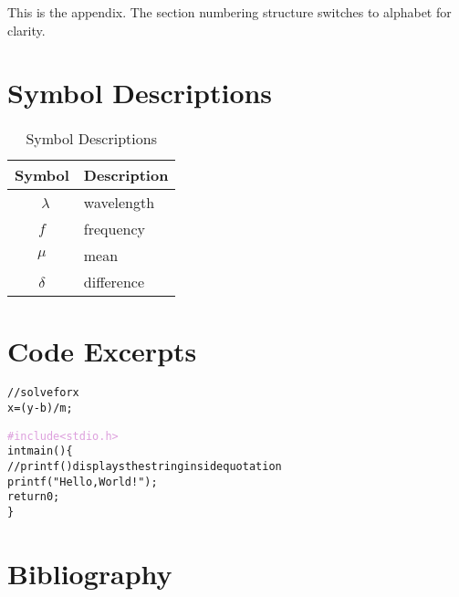 \appendix

This is the appendix.  The section numbering structure switches to alphabet for clarity.

\section{Symbol Descriptions}
\label{sec:symboldescriptions}

	\begin{table}[h]
		\begin{center}
			\caption{Symbol Descriptions}
			\begin{tabular}{|c|l|}
				\hline
				\textbf{Symbol} & \textbf{Description} \\
				\hline
				\hline
				\ $\lambda$ & wavelength \\
				\hline
				$f$ & frequency \\
				\hline
				$\mu$ & mean \\
				\hline
				$\delta$ & difference \\
				\hline
			\end{tabular}
		\end{center}
	\end{table}

\section{Code Excerpts}
	\label{sec:ccode}
	\begin{tcolorbox}[colback=Gray!5!white,colframe=Gray!75!black,title=Linear Equation - Solve for $x$]
		\begin{alltt}
			\textcolor{OliveGreen}{// solve for x}
			x  =  (y - b) / m;
		\end{alltt}
	\end{tcolorbox}
	
	\begin{tcolorbox}[colback=Gray!5!white,colframe=Gray!75!black,title=Hello World]
		\begin{alltt}
			\textcolor{Plum}{#include <stdio.h>}
			int main() \{
			\textcolor{OliveGreen}{// printf() displays the string inside quotation}
			printf("Hello, World!");
			return 0;
			\}
		\end{alltt}
	\end{tcolorbox}

\section{Bibliography}
	\label{sec:bib}
